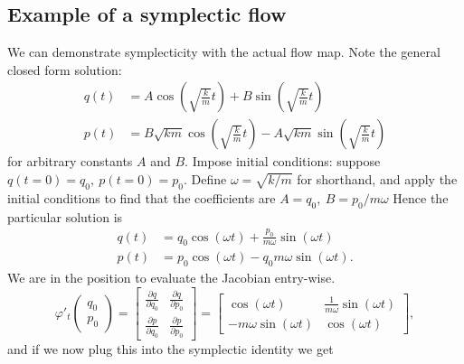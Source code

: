 \documentclass{report}
\theoremstyle{exampstyle} \newtheorem{example}[theorem]{Example}
\theoremstyle{exampstyle} \newtheorem{remark}[theorem]{Remark}
\theoremstyle{exampstyle} \newtheorem{definition}[theorem]{Definition}
\theoremstyle{exampstyle} \newtheorem{lemma}[theorem]{Lemma}
\begin{document}
\subsection{Example of a symplectic flow}
We can demonstrate symplecticity with the actual flow map. Note the general closed form solution:
\begin{equation*}
	\begin{aligned}
		q(t) &= A\cos\left( \sqrt{\frac{k}{m}} t \right) + B \sin\left( \sqrt{\frac{k}{m}}t \right) \\
		p(t) &= B\sqrt{km} \cos\left( \sqrt{\frac{k}{m}} t \right) -A\sqrt{km} \sin\left( \sqrt{\frac{k}{m}}t \right) 
	\end{aligned}
\end{equation*}
for arbitrary constants $A$ and $B$.
Impose initial conditions:
suppose $q(t=0) = q_0,~ p(t=0) = p_0.$
Define $\omega = \sqrt{k/m}$ for shorthand, and apply the initial conditions to find that the coefficients are $A = q_0,~ B = p_0/m \omega$
Hence the particular solution is
\begin{equation*}
	\begin{aligned}
		q(t) &= q_0 \cos\left( \omega t \right) + \frac{p_0}{m\omega} \sin\left( \omega t \right) \\
		p(t) &= p_0 \cos\left( \omega t \right) - q_0 m\omega \sin\left( \omega t \right).
	\end{aligned}
\end{equation*}
We are in the position to evaluate the Jacobian entry-wise.
\begin{equation*}
	\varphi'_t \begin{pmatrix}
		q_0 \\
		p_0
	\end{pmatrix} = \begin{bmatrix}
		\frac{\partial q}{\partial q_0} & \frac{\partial q}{\partial p_0} \\
		\frac{\partial p}{\partial q_0} & \frac{\partial p}{\partial p_0}
	\end{bmatrix} = \begin{bmatrix}
		\cos(\omega t) & \frac{1}{m\omega} \sin(\omega t) \\
		-m\omega \sin(\omega t) & \cos(\omega t)
	\end{bmatrix},
\end{equation*}
and if we now plug this into the symplectic identity we get
\end{document}
